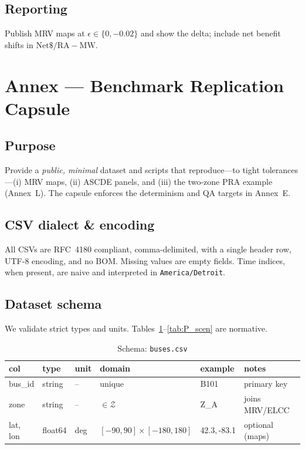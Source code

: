 \documentclass[11pt]{article}
\newcommand{\annexsection}[1]{\section{Annex \thesection{} — #1}}
\numberwithin{equation}{section}
\theoremstyle{definition}
\theoremstyle{remark}
\begin{document}
\subsection{ Reporting}
Publish MRV maps at $\epsilon\in\{0,-0.02\}$ and show the delta; include net benefit shifts in $\mathrm{Net}\$/\mathrm{RA\!-\!MW}$.

\annexsection{Benchmark Replication Capsule}
\label{annex:P}

\subsection{Purpose}
Provide a \emph{public, minimal} dataset and scripts that reproduce---to tight
tolerances---(i) MRV maps, (ii) ASCDE panels, and (iii) the two-zone PRA example
(Annex~L). The capsule enforces the determinism and QA targets in Annex~E.

\subsection{CSV dialect \& encoding}
All CSVs are RFC~4180 compliant, comma-delimited, with a single header row,
UTF-8 encoding, and no BOM. Missing values are empty fields. Time indices, when
present, are naive and interpreted in \texttt{America/Detroit}.

\subsection{Dataset schema}
We validate strict types and units. Tables~\ref{tab:P_buses}--\ref{tab:P_scen}
are normative.

\begin{table}[h]
\centering
\caption{Schema: \texttt{buses.csv}}
\label{tab:P_buses}
\begin{tabular}{@{}llllll@{}}
\toprule
\textbf{col} & \textbf{type} & \textbf{unit} & \textbf{domain} & \textbf{example} & \textbf{notes}\\
\midrule
bus\_id & string & -- & unique & B101 & primary key \\
zone & string & -- & $\in\mathcal{Z}$ & Z\_A & joins MRV/ELCC \\
lat, lon & float64 & deg & $[-90,90]\times[-180,180]$ & 42.3,\,-83.1 & optional (maps) \\
\bottomrule
\end{tabular}
\end{table}
\end{document}
